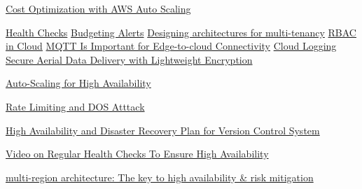 \documentclass{article}
\begin{document}
\begin{thebibliography}{9}

 \href{https://www.cloudkeeper.com/insights/blogs/aws-auto-scaling-cost-optimization-practices-strategies#:~:text=Here%20are%20some%20best%20practices,sure%20you%20have%20the}{Cost Optimization with AWS Auto Scaling}

 \href{https://www.cloudfoundry.org/blog/health-check-apps-cloud-part-1/#:~:text=,some%20sort%20of%20health%20checking}{Health Checks}
 \href{https://www.xenonstack.com/insights/budget-alarms-in-aws#:~:text=,com%E3%80%91}{Budgeting Alerts}
 \href{https://aws.amazon.com/blogs/architecture/lets-architect-multi-tenant-saas-architectures/}{Designing architectures for multi-tenancy}
 \href{https://www.matillion.com/blog/role-based-access-control-rbac-in-the-cloud-iam-roles-matillion}{RBAC in Cloud}
 \href{https://event.moxa.com/newsletter/connection/2019/10/feat_02.html#:~:text=Message%20Queuing%20Telemetry%20Transport%20,cloud%20and%20cloud%20to%20device}{MQTT Is Important for Edge-to-cloud Connectivity}
 \href{https://bluexp.netapp.com/blog/cis-blg-cloud-logging-strategies-for-multi-cloud-environments#:~:text=,events%20occurring%20in%20your%20systems}{Cloud Logging}
 \href{https://link.springer.com/chapter/10.1007/978-3-030-52243-8_17#:~:text=Specifically%2C%20we%20design%20and%20demonstrate,encryption%2C%20in%20order%20to}{Secure Aerial Data Delivery with Lightweight Encryption}

 \href{https://www.cloudlaya.com/blog/using-auto-scaling-and-load-balancing-for-high-availability/}{Auto-Scaling for High Availability}

 \href{https://www.solo.io/topics/rate-limiting/}{Rate Limiting and DOS Atttack}

 \href{https://www.linkedin.com/pulse/high-availability-disaster-recovery-plan-version-control-kosiec/}{High Availability and Disaster Recovery Plan for Version Control System}

 \href{https://youtu.be/opxEYVcsubk?si=QCq5AcQ3x9gB4NVe}{Video on Regular Health Checks To Ensure High Availability}

 \href{https://www.cockroachlabs.com/blog/multi-region-architecture-ha/}{multi-region architecture: The key to high availability & risk mitigation}


\end{thebibliography}
\end{document}

